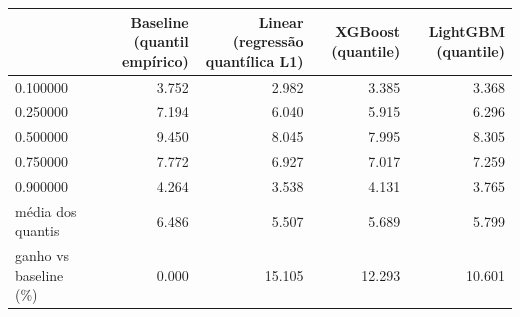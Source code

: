 \begin{tabular}{lrrrr}
\toprule
 & Baseline (quantil empírico) & Linear (regressão quantílica L1) & XGBoost (quantile) & LightGBM (quantile) \\
\midrule
0.100000 & 3.752 & 2.982 & 3.385 & 3.368 \\
0.250000 & 7.194 & 6.040 & 5.915 & 6.296 \\
0.500000 & 9.450 & 8.045 & 7.995 & 8.305 \\
0.750000 & 7.772 & 6.927 & 7.017 & 7.259 \\
0.900000 & 4.264 & 3.538 & 4.131 & 3.765 \\
média dos quantis & 6.486 & 5.507 & 5.689 & 5.799 \\
ganho vs baseline (\%) & 0.000 & 15.105 & 12.293 & 10.601 \\
\bottomrule
\end{tabular}

